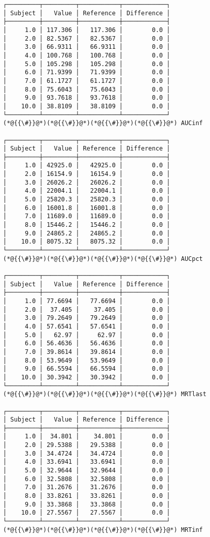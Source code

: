 \documentclass[12pt,a4paper]{article}
\begin{document}
\begin{lstlisting}
┌─────────┬─────────┬───────────┬────────────┐
│ Subject │   Value │ Reference │ Difference │
├─────────┼─────────┼───────────┼────────────┤
│     1.0 │ 117.306 │   117.306 │        0.0 │
│     2.0 │ 82.5367 │   82.5367 │        0.0 │
│     3.0 │ 66.9311 │   66.9311 │        0.0 │
│     4.0 │ 100.768 │   100.768 │        0.0 │
│     5.0 │ 105.298 │   105.298 │        0.0 │
│     6.0 │ 71.9399 │   71.9399 │        0.0 │
│     7.0 │ 61.1727 │   61.1727 │        0.0 │
│     8.0 │ 75.6043 │   75.6043 │        0.0 │
│     9.0 │ 93.7618 │   93.7618 │        0.0 │
│    10.0 │ 38.8109 │   38.8109 │        0.0 │
└─────────┴─────────┴───────────┴────────────┘
(*@{{\#}}@*)(*@{{\#}}@*)(*@{{\#}}@*)(*@{{\#}}@*) AUCinf

┌─────────┬─────────┬───────────┬────────────┐
│ Subject │   Value │ Reference │ Difference │
├─────────┼─────────┼───────────┼────────────┤
│     1.0 │ 42925.0 │   42925.0 │        0.0 │
│     2.0 │ 16154.9 │   16154.9 │        0.0 │
│     3.0 │ 26026.2 │   26026.2 │        0.0 │
│     4.0 │ 22004.1 │   22004.1 │        0.0 │
│     5.0 │ 25820.3 │   25820.3 │        0.0 │
│     6.0 │ 16001.8 │   16001.8 │        0.0 │
│     7.0 │ 11689.0 │   11689.0 │        0.0 │
│     8.0 │ 15446.2 │   15446.2 │        0.0 │
│     9.0 │ 24865.2 │   24865.2 │        0.0 │
│    10.0 │ 8075.32 │   8075.32 │        0.0 │
└─────────┴─────────┴───────────┴────────────┘
(*@{{\#}}@*)(*@{{\#}}@*)(*@{{\#}}@*)(*@{{\#}}@*) AUCpct

┌─────────┬─────────┬───────────┬────────────┐
│ Subject │   Value │ Reference │ Difference │
├─────────┼─────────┼───────────┼────────────┤
│     1.0 │ 77.6694 │   77.6694 │        0.0 │
│     2.0 │  37.405 │    37.405 │        0.0 │
│     3.0 │ 79.2649 │   79.2649 │        0.0 │
│     4.0 │ 57.6541 │   57.6541 │        0.0 │
│     5.0 │   62.97 │     62.97 │        0.0 │
│     6.0 │ 56.4636 │   56.4636 │        0.0 │
│     7.0 │ 39.8614 │   39.8614 │        0.0 │
│     8.0 │ 53.9649 │   53.9649 │        0.0 │
│     9.0 │ 66.5594 │   66.5594 │        0.0 │
│    10.0 │ 30.3942 │   30.3942 │        0.0 │
└─────────┴─────────┴───────────┴────────────┘
(*@{{\#}}@*)(*@{{\#}}@*)(*@{{\#}}@*)(*@{{\#}}@*) MRTlast

┌─────────┬─────────┬───────────┬────────────┐
│ Subject │   Value │ Reference │ Difference │
├─────────┼─────────┼───────────┼────────────┤
│     1.0 │  34.801 │    34.801 │        0.0 │
│     2.0 │ 29.5388 │   29.5388 │        0.0 │
│     3.0 │ 34.4724 │   34.4724 │        0.0 │
│     4.0 │ 33.6941 │   33.6941 │        0.0 │
│     5.0 │ 32.9644 │   32.9644 │        0.0 │
│     6.0 │ 32.5808 │   32.5808 │        0.0 │
│     7.0 │ 31.2676 │   31.2676 │        0.0 │
│     8.0 │ 33.8261 │   33.8261 │        0.0 │
│     9.0 │ 33.3868 │   33.3868 │        0.0 │
│    10.0 │ 27.5567 │   27.5567 │        0.0 │
└─────────┴─────────┴───────────┴────────────┘
(*@{{\#}}@*)(*@{{\#}}@*)(*@{{\#}}@*)(*@{{\#}}@*) MRTinf


\end{lstlisting}
\end{document}
